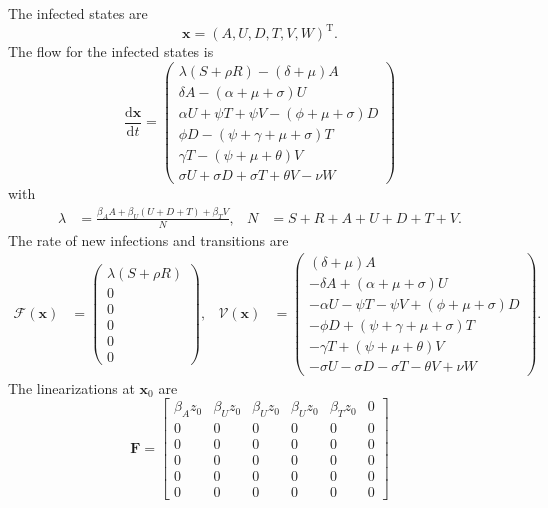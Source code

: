 \documentclass{article}
\newcommand{\md}{\mathrm{d}}
\newcommand{\mT}{\mathrm{T}}
\renewcommand{\vec}[1]{\mathbf{#1}}
\newcommand{\mat}[1]{\mathbf{#1}}
\begin{document}
The infected states are
\begin{equation}
  \vec{x} = \left(A, U, D, T, V, W\right)^{\mT}.
\end{equation}
The flow for the infected states is
\begin{equation}
  \frac{\md \vec{x}}{\md t} =
  \begin{pmatrix}
    \lambda (S +\rho R) - (\delta + \mu) A
    \\
    \delta A - (\alpha + \mu + \sigma) U
    \\
    \alpha U + \psi T + \psi V - (\phi + \mu + \sigma) D
    \\
    \phi D - (\psi + \gamma + \mu + \sigma) T
    \\
    \gamma T - (\psi + \mu + \theta) V
    \\
    \sigma U + \sigma D + \sigma T + \theta V - \nu W
  \end{pmatrix}
\end{equation}
with
\begin{align}
  \lambda &= \frac{\beta_A A + \beta_U (U + D + T) + \beta_T V}{N},
  &
  N &= S + R + A + U + D + T + V.
\end{align}
The rate of new infections and transitions are
\begin{align}
  \mathcal{F}(\vec{x}) &=
  \begin{pmatrix}
    \lambda (S +\rho R)
    \\
    0
    \\
    0
    \\
    0
    \\
    0
    \\
    0
  \end{pmatrix},
  &
  \mathcal{V}(\vec{x}) &=
  \begin{pmatrix}
    (\delta + \mu) A
    \\
    - \delta A + (\alpha + \mu + \sigma) U
    \\
    - \alpha U - \psi T - \psi V + (\phi + \mu + \sigma) D
    \\
    - \phi D + (\psi + \gamma + \mu + \sigma) T
    \\
    - \gamma T + (\psi + \mu + \theta) V
    \\
    - \sigma U - \sigma D - \sigma T - \theta V + \nu W
  \end{pmatrix}.
\end{align}
The linearizations at $\vec{x}_0$ are
\begin{equation}
  \mat{F}
  =
  \begin{bmatrix}
    \beta_A z_0
    &
    \beta_U z_0
    &
    \beta_U z_0
    &
    \beta_U z_0
    &
    \beta_T z_0
    &
    0
    \\
    0 & 0 & 0 & 0 & 0 & 0
    \\
    0 & 0 & 0 & 0 & 0 & 0
    \\
    0 & 0 & 0 & 0 & 0 & 0
    \\
    0 & 0 & 0 & 0 & 0 & 0
    \\
    0 & 0 & 0 & 0 & 0 & 0
  \end{bmatrix}
\end{equation}
\end{document}
